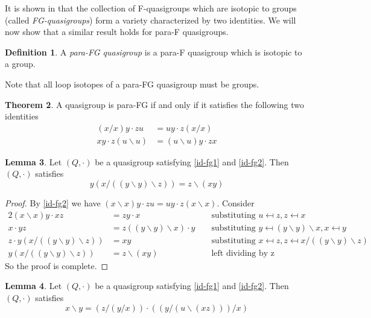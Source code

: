 \documentclass[12pt]{report}
\theoremstyle{definition}
\newtheorem{thm}{Theorem}[chapter]
\newtheorem{lem}[thm]{Lemma}
\newtheorem{dfn}[thm]{Definition}
\newcommand{\ldv}{\backslash}       %
\newcommand{\rdv}{/}                %
\begin{document}
It is shown in \cite{FG} that the collection of F-quasigroups which are isotopic to groups
  (called \emph{FG-quasigroups}) form a variety characterized by two identities. We will now
  show that a similar result holds for para-F quasigroups.

\begin{dfn}
  A \emph{para-FG quasigroup} is a para-F quasigroup which is isotopic to a group.
\end{dfn}

Note that all loop isotopes of a para-FG quasigroup must be groups.

\begin{thm}\label{thm-para-FG}
  A quasigroup is para-FG if and only if it satisfies the following two identities
  \begin{align*}
    (x\rdv x)y\cdot zu &= uy\cdot z(x\rdv x)\label{id-fg1} \tag{FG1}\\
    xy\cdot z(u\ldv u) &= (u\ldv u)y\cdot zx\label{id-fg2} \tag{FG2}
  \end{align*}
\end{thm}

\begin{lem}\label{lem-33}
  Let $(Q, \cdot)$ be a quasigroup satisfying \ref{id-fg1} and \ref{id-fg2}. Then $(Q, \cdot)$ satisfies
  \[y(x\rdv((y\ldv y)\ldv z)) = z\ldv(xy)\]
\end{lem}

\begin{proof}
  By \ref{id-fg2} we have $(x\ldv x)y\cdot zu = uy\cdot z(x\ldv x)$. Consider
  \begin{alignat*}{2}
    (x\ldv x)y\cdot xz &= zy\cdot x &&\text{ substituting $u\mapsfrom z, z\mapsfrom x$}\\
    x\cdot yz &= z((y\ldv y)\ldv x)\cdot y &&\text{ substituting
      $y\mapsfrom (y\ldv y)\ldv x, x\mapsfrom y$}\\
    z\cdot y(x\rdv((y\ldv y)\ldv z)) &= xy &&\text{ substituting
      $x\mapsfrom z, z\mapsfrom x\rdv((y\ldv y)\ldv z)$}\\
    y(x\rdv((y\ldv y)\ldv z)) &= z\ldv(xy) &&\text{ left dividing by z}
  \end{alignat*}
  So the proof is complete.
\end{proof}

\begin{lem}\label{lem-34}
  Let $(Q, \cdot)$ be a quasigroup satisfying \ref{id-fg1} and \ref{id-fg2}. Then $(Q, \cdot)$ satisfies
  \[x\ldv y = (z\rdv (y\rdv x))\cdot ((y\rdv (u\ldv(xz)))\rdv x)\]
\end{lem}
\end{document}

